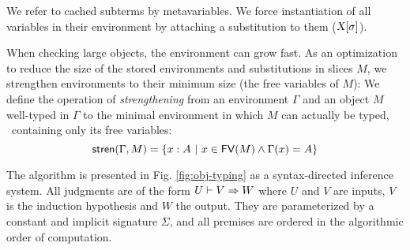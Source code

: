 \documentclass{llncs}
\begin{document}
We refer to cached subterms by metavariables. We force instantiation
of all variables in their environment by attaching a substitution to
them (${\text{\textsl{X}}}[{\sigma}]$).

When checking large objects, the environment can grow fast. As an
optimization to reduce the size of the stored environments and
substitutions in slices $M$, we strengthen environments to their
minimum size (the free variables of $M$): We define the operation of
\emph{strengthening} from an environment $\Gamma$ and an object $M$
well-typed in $\Gamma$ to the minimal environment in which $M$ can
actually be typed, \ie\ containing only its free variables:
$$
{\text{\textsf{stren}}}({\Gamma,M}) = \{x : A\ |\ x\in {\text{\textsf{FV}}}({M}) \wedge \Gamma(x)=A\}
$$

The algorithm is presented in Fig. \ref{fig:obj-typing} as a
syntax-directed inference system. All judgments are of the form ${U}\vdash{{V}\Rightarrow{W}}$ where $U$ and $V$ are inputs, $V$ is the induction hypothesis
and $W$ the output. They are parameterized by a constant and implicit
signature $\Sigma$, and all premises are ordered in the algorithmic
order of computation.
\end{document}
